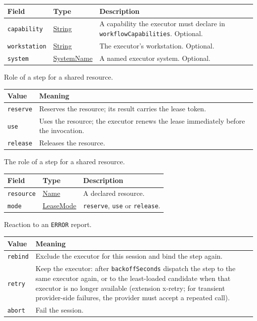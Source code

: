 \documentclass[a4paper]{arrowhead}
\newcommand{\mref}[1]{{\textcolor{ArrowheadPurple}{\hyperref[sec:model:#1]{#1}}}}
\newcommand{\pref}[1]{{\textcolor{ArrowheadGrey}{\hyperref[sec:model:primitives:#1]{#1}}}}
\begin{document}
{\small
\begin{longtable}{|p{3.9cm}|p{4.4cm}|p{7.5cm}|}

\hline
\rowcolor{gray!33} Field & Type & Description \\ \hline
\endhead
\texttt{capability} & \pref{String} & A capability the executor must declare in \texttt{workflow\allowbreak{}Capabilities}. Optional. \\ \hline
\texttt{workstation} & \pref{String} & The executor's workstation. Optional. \\ \hline
\texttt{system} & \pref{SystemName} & A named executor system. Optional. \\ \hline
\end{longtable}
}

Role of a step for a shared resource.

{\small
\begin{longtable}{|p{3.9cm}|p{11.9cm}|}

\hline
\rowcolor{gray!33} Value & Meaning \\ \hline
\endhead
\texttt{reserve} & Reserves the resource; its result carries the lease token. \\ \hline
\texttt{use} & Uses the resource; the executor renews the lease immediately before the invocation. \\ \hline
\texttt{release} & Releases the resource. \\ \hline
\end{longtable}
}

The role of a step for a shared resource.

{\small
\begin{longtable}{|p{3.9cm}|p{4.4cm}|p{7.5cm}|}

\hline
\rowcolor{gray!33} Field & Type & Description \\ \hline
\endhead
\texttt{resource} & \pref{Name} & A declared resource. \\ \hline
\texttt{mode} & \mref{LeaseMode} & \texttt{reserve}, \texttt{use} or \texttt{release}. \\ \hline
\end{longtable}
}

Reaction to an \texttt{ERROR} report.

{\small
\begin{longtable}{|p{3.9cm}|p{11.9cm}|}

\hline
\rowcolor{gray!33} Value & Meaning \\ \hline
\endhead
\texttt{rebind} & Exclude the executor for this session and bind the step again. \\ \hline
\texttt{retry} & Keep the executor: after \texttt{backoff\allowbreak{}Seconds} dispatch the step to the same executor again, or to the least-loaded candidate when that executor is no longer available (extension x-retry; for transient provider-side failures, the provider must accept a repeated call). \\ \hline
\texttt{abort} & Fail the session. \\ \hline
\end{longtable}
}
\end{document}
